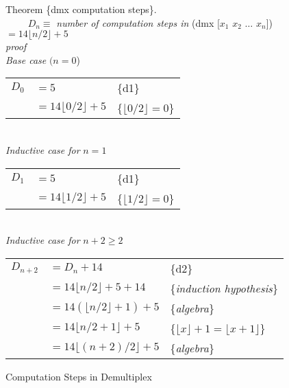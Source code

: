 \begin{figure}
Theorem \{dmx computation steps\}. \\
~~~~ $D_n \equiv$ \emph{number of computation steps in} \textsf{(dmx [$x_1$ $x_2$ $\dots$ $x_n$])} $= 14\lfloor n/2\rfloor + 5$\\
\emph{proof} \vspace{1mm}\\
\emph{Base case} $(n=0$) \\
\begin{tabular}{lll}
$D_{0}$&$= 5$                        & \{d1\} \\
       &$= 14\lfloor 0/2\rfloor + 5$ & \{$\lfloor 0/2\rfloor=0$\} \\
\end{tabular}
\vspace{1mm}\\
\emph{Inductive case for} $n=1$\\
\begin{tabular}{lll}
$D_{1}$&$= 5$                        & \{d1\} \\
       &$= 14\lfloor 1/2\rfloor + 5$ & \{$\lfloor 1/2\rfloor=0$\} \\
\end{tabular}
\vspace{1mm}\\
\emph{Inductive case for} $n+2 \geq 2$\\
\begin{tabular}{lll}
$D_{n+2}$ &$= D_n + 14$                      & \{d2\} \\
          &$= 14\lfloor n/2\rfloor + 5 + 14$ & \{\emph{induction hypothesis}\} \\
          &$= 14(\lfloor n/2\rfloor + 1) + 5$& \{\emph{algebra}\} \\
          &$= 14\lfloor n/2 + 1\rfloor + 5$  & \{$\lfloor x\rfloor + 1 = \lfloor x+1\rfloor$\} \\
          &$= 14\lfloor(n+2)/2\rfloor + 5$   & \{\emph{algebra}\} \\
\end{tabular}
\caption{Computation Steps in Demultiplex}
\label{fig:dmx-computation-time}
\end{figure}

